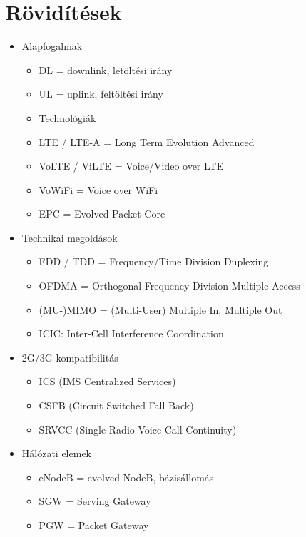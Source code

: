 \documentclass[10pt,a4paper]{article}
\begin{document}
\section{Rövidítések}
\begin{multicols}{2}
	\begin{minipage}{0.45\textwidth}
	\begin{itemize}
		\item Alapfogalmak
	\begin{itemize}
		\item DL = downlink, letöltési irány
		\item UL = uplink, feltöltési irány
		\item Technológiák
		\item LTE / LTE-A = Long Term Evolution Advanced
		\item VoLTE / ViLTE = Voice/Video over LTE
		\item VoWiFi = Voice over WiFi
		\item EPC = Evolved Packet Core
	\end{itemize}
	\item Technikai megoldások
	\begin{itemize}
		\item FDD / TDD = Frequency/Time Division Duplexing
		\item OFDMA = Orthogonal Frequency Division Multiple Access
		\item (MU-)MIMO = (Multi-User) Multiple In, Multiple Out
		\item ICIC: Inter-Cell Interference Coordination
	\end{itemize}
		\item 2G/3G kompatibilitás
		\begin{itemize}
		\item ICS (IMS Centralized Services)
		\item CSFB (Circuit Switched Fall Back)
		\item SRVCC (Single Radio Voice Call Continuity)
		\end{itemize}
	\end{itemize}
	\end{minipage}
	\begin{itemize}
		\item Hálózati elemek
		\begin{itemize}
			\item eNodeB = evolved NodeB, bázisállomás
			\item SGW = Serving Gateway
			\item PGW = Packet Gateway

\end{itemize}
\end{itemize}
\end{multicols}
\end{document}
